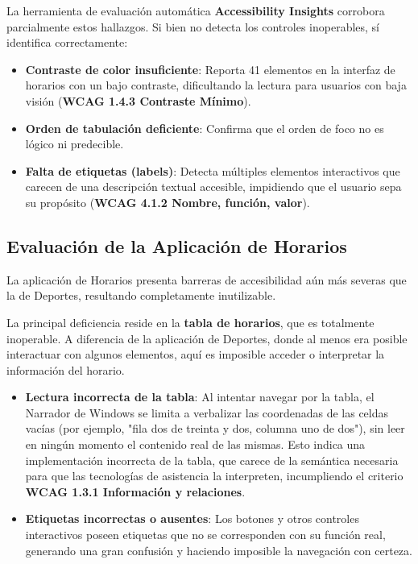 \documentclass{article}
\begin{document}
	La herramienta de evaluación automática \textbf{Accessibility Insights} corrobora parcialmente estos hallazgos. Si bien no detecta los controles inoperables, sí identifica correctamente:
	\begin{itemize}
		\item \textbf{Contraste de color insuficiente}: Reporta 41 elementos en la interfaz de horarios con un bajo contraste, dificultando la lectura para usuarios con baja visión (\textbf{WCAG 1.4.3 Contraste Mínimo}).
		\item \textbf{Orden de tabulación deficiente}: Confirma que el orden de foco no es lógico ni predecible.
		\item \textbf{Falta de etiquetas (labels)}: Detecta múltiples elementos interactivos que carecen de una descripción textual accesible, impidiendo que el usuario sepa su propósito (\textbf{WCAG 4.1.2 Nombre, función, valor}).
	\end{itemize}

	\subsection{Evaluación de la Aplicación de Horarios}

	La aplicación de Horarios presenta barreras de accesibilidad aún más severas que la de Deportes, resultando completamente inutilizable.

	La principal deficiencia reside en la \textbf{tabla de horarios}, que es totalmente inoperable. A diferencia de la aplicación de Deportes, donde al menos era posible interactuar con algunos elementos, aquí es imposible acceder o interpretar la información del horario.

	\begin{itemize}
		\item \textbf{Lectura incorrecta de la tabla}: Al intentar navegar por la tabla, el Narrador de Windows se limita a verbalizar las coordenadas de las celdas vacías (por ejemplo, "fila dos de treinta y dos, columna uno de dos"), sin leer en ningún momento el contenido real de las mismas. Esto indica una implementación incorrecta de la tabla, que carece de la semántica necesaria para que las tecnologías de asistencia la interpreten, incumpliendo el criterio \textbf{WCAG 1.3.1 Información y relaciones}.

		\item \textbf{Etiquetas incorrectas o ausentes}: Los botones y otros controles interactivos poseen etiquetas que no se corresponden con su función real, generando una gran confusión y haciendo imposible la navegación con certeza.
	\end{itemize}
\end{document}
